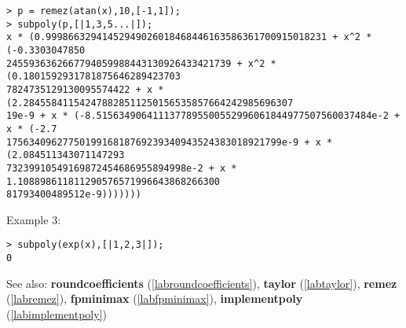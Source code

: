 \begin{center}\begin{minipage}{15cm}\begin{Verbatim}[frame=single]
> p = remez(atan(x),10,[-1,1]);
> subpoly(p,[|1,3,5...|]);
x * (0.99986632941452949026018468446163586361700915018231 + x^2 * (-0.3303047850
2455936362667794059988443130926433421739 + x^2 * (0.1801592931781875646289423703
7824735129130095574422 + x * (2.284558411542478828511250156535857664242985696307
19e-9 + x * (-8.5156349064111377895500552996061844977507560037484e-2 + x * (-2.7
1756340962775019916818769239340943524383018921799e-9 + x * (2.084511343071147293
73239910549169872454686955894998e-2 + x * 1.108898611811290576571996643868266300
81793400489512e-9)))))))
\end{Verbatim}
\end{minipage}\end{center}
\noindent Example 3: 
\begin{center}\begin{minipage}{15cm}\begin{Verbatim}[frame=single]
> subpoly(exp(x),[|1,2,3|]);
0
\end{Verbatim}
\end{minipage}\end{center}
See also: \textbf{roundcoefficients} (\ref{labroundcoefficients}), \textbf{taylor} (\ref{labtaylor}), \textbf{remez} (\ref{labremez}), \textbf{fpminimax} (\ref{labfpminimax}), \textbf{implementpoly} (\ref{labimplementpoly})
